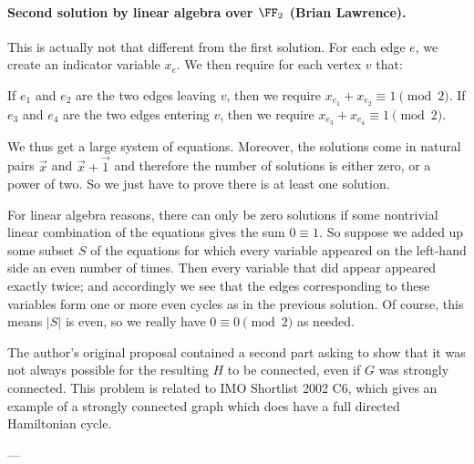 \paragraph{Second solution by linear algebra over $\FF_2$ (Brian Lawrence).}
This is actually not that different from the first solution.
For each edge $e$, we create an indicator variable $x_e$.
We then require for each vertex $v$ that:
\begin{itemize}
  \ii If $e_1$ and $e_2$ are the two edges leaving $v$,
  then we require $x_{e_1} + x_{e_2} \equiv 1 \pmod 2$.
  \ii If $e_3$ and $e_4$ are the two edges entering $v$,
  then we require $x_{e_3} + x_{e_4} \equiv 1 \pmod 2$.
\end{itemize}
We thus get a large system of equations.
Moreover, the solutions come in natural pairs $\vec x$ and $\vec x + \vec 1$
and therefore the number of solutions is either zero, or a power of two.
So we just have to prove there is at least one solution.

For linear algebra reasons, there can only be zero solutions
if some nontrivial linear combination of the equations gives the sum $0 \equiv 1$.
So suppose we added up some subset $S$ of the equations
for which every variable appeared on the left-hand side an even number of times.
Then every variable that did appear appeared exactly twice;
and accordingly we see that the edges corresponding to these variables
form one or more even cycles as in the previous solution.
Of course, this means $|S|$ is even, so we really have $0 \equiv 0 \pmod 2$ as needed.

\begin{remark*}
  The author's original proposal contained a second part
  asking to show that it was not always possible
  for the resulting $H$ to be connected,
  even if $G$ was strongly connected.
  This problem is related to IMO Shortlist 2002 C6,
  which gives an example of a strongly connected graph
  which does have a full directed Hamiltonian cycle.
\end{remark*}

---


